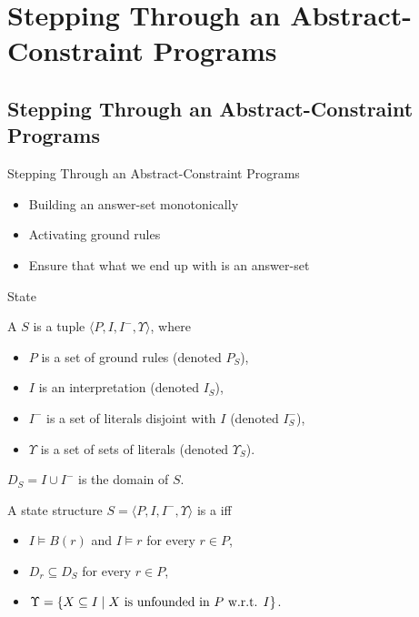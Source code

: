 \documentclass{beamer}
\begin{document}
\section[Advanced Stepping]{Stepping Through an Abstract-Constraint Programs}


\subsection[Advanced Stepping]{Stepping Through an Abstract-Constraint Programs}

\begin{frame}{Stepping Through an Abstract-Constraint Programs}

	\begin{itemize}
		\item Building an answer-set monotonically
		\item Activating ground rules
		\item Ensure that what we end up with is an answer-set
	\end{itemize}

\end{frame}

\begin{frame}{State}

	\begin{definition}
	A \emph{} $S$ is a tuple $\langle P, I, I^-, \Upsilon \rangle$, where
	\begin{itemize}
		\item $P$ is a set of ground rules (denoted $P_S$),
		\item $I$ is an interpretation (denoted $I_S$),
		\item $I^-$ is a set of literals disjoint with $I$ (denoted $I^-_S$),
		\item $\Upsilon$ is a set of sets of literals (denoted $\Upsilon_S$).
	\end{itemize}
	$D_S = I \cup I^-$ is the domain of $S$.
	\end{definition}

	\pause

	\begin{definition}[state]
	A state structure $S = \langle P, I, I^-, \Upsilon \rangle$ is a \emph{} iff
	\begin{itemize}
		\item $I \models B(r)$ and $I \models r$ for every $r \in P$,
		\item $D_r \subseteq D_S$ for every $r \in P$,
		\item $\Upsilon = \{X \subseteq I \mid X\text{ is unfounded in }P\text{ w.r.t. }I\}$.
	\end{itemize}
	\end{definition}

\end{frame}
\end{document}
